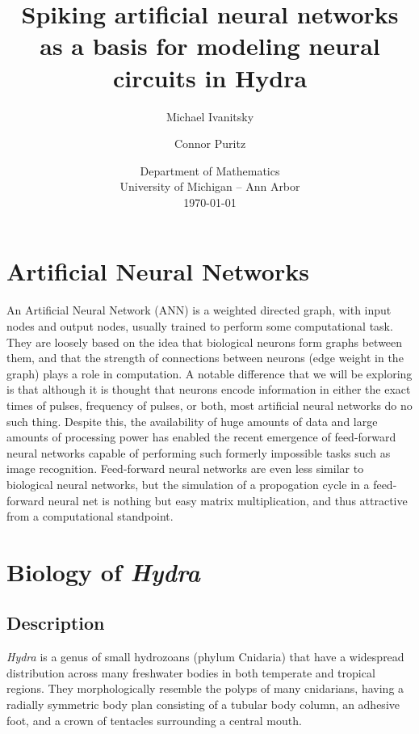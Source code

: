 \documentclass{article}
\begin{document}
\title{Spiking artificial neural networks as a basis for modeling neural circuits in Hydra}

\author{Michael Ivanitsky \and Connor Puritz}
\date{%
    Department of Mathematics\\ University of Michigan -- Ann Arbor\\[2ex]%
    \today
}

\maketitle

\begin{abstract}


\end{abstract}

\section{Artificial Neural Networks}
An Artificial Neural Network (ANN) is a weighted directed graph, with input nodes and output nodes, usually trained to perform some computational task. They are loosely based on the idea that biological neurons form graphs between them, and that the strength of connections between neurons (edge weight in the graph) plays a role in computation. A notable difference that we will be exploring is that although it is thought that neurons encode information in either the exact times of pulses, frequency of pulses, or both, most artificial neural networks do no such thing. Despite this, the availability of huge amounts of data and large amounts of processing power has enabled the recent emergence of feed-forward neural networks capable of performing such formerly impossible tasks such as image recognition. Feed-forward neural networks are even less similar to biological neural networks, but the simulation of a propogation cycle in a feed-forward neural net is nothing but easy matrix multiplication, and thus attractive from a computational standpoint.

\newpage

\section{Biology of \textit{Hydra}}
\subsection{Description}
\label{subsection:description}
\textit{Hydra} is a genus of small hydrozoans (phylum Cnidaria) that have a widespread distribution across many freshwater bodies in both temperate and tropical regions. They morphologically resemble the polyps of many cnidarians, having a radially symmetric body plan consisting of a tubular body column, an adhesive foot, and a crown of tentacles surrounding a central mouth.
\end{document}
